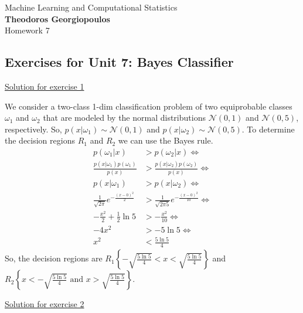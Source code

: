 \documentclass[12pt]{book}
\begin{document}
\begin{center}
{\Large Machine Learning and Computational Statistics}\\
\large\textbf{Theodoros Georgiopoulos}\\ %
\Large Homework 7 %
\end{center}

\vspace{0.2 cm}
\begin{center}
	\subsection*{Exercises for Unit 7: Bayes Classifier}
\end{center}
\vspace{0.2 cm}

{\underline{\large Solution for exercise 1}}
\vspace{0.1 cm}

\noindent

We consider a two-class 1-dim classification problem of two equiprobable classes $\omega_1$ and $\omega_2$ that are modeled by the normal distributions $\mathcal{N}(0,1)$ and $\mathcal{N}(0,5)$, respectively. So, $p(x|\omega_1) \sim \mathcal{N}(0,1)$ and $p(x|\omega_2) \sim \mathcal{N}(0,5)$. To determine the decision regions $R_1$ and $R_2$ we can use the Bayes rule.
\begin{align*}
p(\omega_1|x) &> p(\omega_2|x) \iff \\ \frac{p(x|\omega_1)p(\omega_1)}{p(x)} &> \frac{p(x|\omega_2)p(\omega_2)}{p(x)}  \iff \\ p(x|\omega_1) &> p(x|\omega_2) \iff \\
\frac{1}{\sqrt{2\pi}}e^{-\frac{(x-0)^2}{2}} &> \frac{1}{\sqrt{2\pi 5}}e^{-\frac{(x-0)^2}{10}} \iff \\
-\frac{x^2}{2} + \frac{1}{2}\ln 5 &> -\frac{x^2}{10} \iff \\
-4x^2 &>-5\ln5 \iff \\
x^2 &< \frac{5\ln5}{4}
\end{align*}
So, the decision regions are $R_1 \left\{-\sqrt{\frac{5\ln5}{4}} < x < \sqrt{\frac{5\ln5}{4}}  \right\}$ and $R_2 \left\{x <-\sqrt{\frac{5\ln5}{4}} \text{ and } x > \sqrt{\frac{5\ln5}{4}}  \right\}$.



\vspace{0.3 cm}
{\underline{\large Solution for exercise 2}}
\vspace{0.3 cm}
\end{document}
